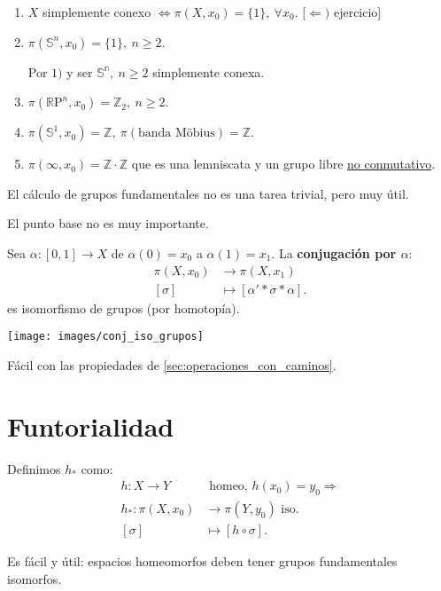 \begin{ej}
\begin{enumerate}
    \item $X$ simplemente conexo $\Leftrightarrow \pi\left( X, x_0 \right) = \{1\},\ \forall x_0$. [$\Leftarrow)$ ejercicio]
    \item $\pi\left( \mathbb{S}^n, x_0 \right) = \{1\},\ n \ge 2$.
    \begin{demo}
    Por $1)$ y ser $\mathbb{S^n},\ n \ge 2$ simplemente conexa.
    \end{demo}
    \item $\pi\left( \mathbb{R}\mathrm{P}^n, x_0 \right) = \mathbb{Z}_2,\ n \ge 2$.
    \item $\pi\left( \mathbb{S}^1, x_0 \right) = \mathbb{Z},\ \pi\left( \text{banda Möbius} \right) = \mathbb{Z}$.
    \item $\pi\left( \infty, x_0 \right) = \mathbb{Z} \cdot \mathbb{Z}$ que es una lemniscata y un grupo libre \underline{no conmutativo}.
\end{enumerate}
\end{ej}
El cálculo de grupos fundamentales no es una tarea trivial, pero muy útil.

El punto base no es muy importante.
\begin{prop}
Sea $\alpha: \left[ 0, 1 \right] \rightarrow X$ de $\alpha\left( 0 \right) = x_0$ a $\alpha\left( 1 \right) = x_1$. La \textbf{conjugación por $\alpha$}:
\begin{align*}
    \pi\left( X, x_0 \right) &\rightarrow \pi\left( X, x_1 \right)\\
    \left[ \sigma \right] &\mapsto \left[ \alpha' * \sigma * \alpha \right] 
.\end{align*}
es isomorfismo de grupos (por homotopía).
\begin{center}
    \texttt{[image: images/conj\_iso\_grupos]} 
\end{center}
\end{prop}
\begin{demo}
Fácil con las propiedades de \ref{sec:operaciones_con_caminos}.
\end{demo}

\section{Funtorialidad}%
\label{sec:funtorialidad}
\begin{defi}    
Definimos $h_*$ como:
\begin{align*}
    h: X \rightarrow Y &\text{ homeo, } h\left( x_0 \right) = y_0 \Rightarrow\\
    h_*: \pi\left( X, x_0 \right) &\rightarrow \pi\left( Y, y_0 \right) \text{ iso.}\\
    \left[ \sigma \right] &\mapsto \left[ h \circ \sigma \right] 
.\end{align*}
\end{defi}
Es fácil y útil: espacios homeomorfos deben tener grupos fundamentales isomorfos.

